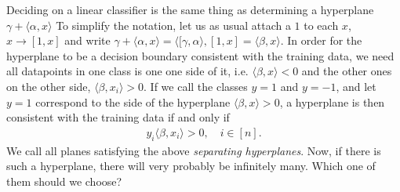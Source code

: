 \documentclass{article}
\newcommand{\sprod}[1]{\langle #1 \rangle}
\begin{document}
Deciding on a linear classifier is the same thing as determining a hyperplane $\gamma + \sprod{\alpha,x}$  To simplify the notation, let us as usual attach a $1$ to each $x$, $x\to [1,x]$ and write $\gamma + \sprod{\alpha,x} = \sprod{[\gamma,\alpha},[1,x]=\sprod{\beta,x}$. In order for the hyperplane to be a  decision boundary consistent with the training data, we need all datapoints in one class is one one side of it, i.e. $\sprod{\beta,x}<0$ and the other ones on the other side, $\sprod{\beta,x_i}>0$. If we call the classes $y=1$ and $y=-1$, and let $y=1$ correspond to the side of the hyperplane $\sprod{\beta,x}>0$, a hyperplane is then consistent with the training data if and only if
\begin{align*}
    y_i \sprod{\beta,x_i}>0, \quad i \in [n].
\end{align*}
We call all planes satisfying the above \emph{separating hyperplanes}. Now, if there is such a hyperplane, there will very probably be infinitely many. Which one of them should we choose?
\end{document}
